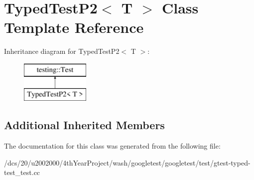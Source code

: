 \hypertarget{classTypedTestP2}{}\section{Typed\+Test\+P2$<$ T $>$ Class Template Reference}
\label{classTypedTestP2}
Inheritance diagram for Typed\+Test\+P2$<$ T $>$\+:\begin{figure}[H]
\begin{center}
\leavevmode
\includegraphics[height=2.000000cm]{classTypedTestP2}
\end{center}
\end{figure}
\subsection*{Additional Inherited Members}


The documentation for this class was generated from the following file\+:\begin{DoxyCompactItemize}
\item 
/dcs/20/u2002000/4th\+Year\+Project/wash/googletest/googletest/test/gtest-\/typed-\/test\+\_\+test.\+cc\end{DoxyCompactItemize}
